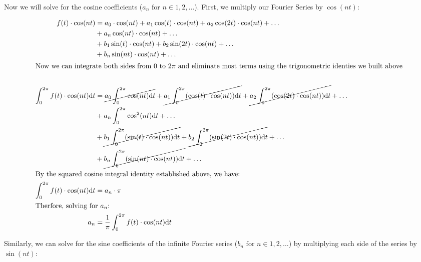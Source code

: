 \documentclass[10pt]{article} %
\begin{document}
Now we will solve for the cosine coefficients ($a_n \text{ for } n \in 1, 2, \dots$). First, we multiply our Fourier Series by $\cos(nt)$:

\begin{align*}
    f(t) \cdot \cos(nt) & = a_0 \cdot \cos(nt) + a_1\cos(t) \cdot \cos(nt) + a_2\cos(2t) \cdot \cos(nt) + \dots\\
    & + a_n\cos(nt) \cdot \cos(nt) + \dots \\
    & + b_1\sin(t) \cdot \cos(nt) + b_2\sin(2t) \cdot \cos(nt) + \dots \\
    & + b_n\sin(nt) \cdot \cos(nt) + \dots \\
    \intertext{Now we can integrate both sides from $0$ to $2\pi$ and eliminate most terms using the trigonometric identies we built above}\\
    \int_0^{2\pi}f(t) \cdot \cos(nt)\mathrm{d}t &= \cancel{a_0 \int_0^{2\pi} \cos(nt) \mathrm{d}t} + \cancel{a_1\int_0^{2\pi}(\cos(t) \cdot \cos(nt)) \mathrm{d}t} + \cancel{a_2\int_0^{2\pi}(\cos(2t) \cdot \cos(nt)) \mathrm{d}t} + \dots \\
    & + a_n\int_0^{2\pi} \cos^2(nt) \mathrm{d}t + \dots \\
    & + \cancel{b_1\int_0^{2\pi}(\sin(t) \cdot \cos(nt)) \mathrm{d}t} + \cancel{b_2\int_0^{2\pi}(\sin(2t) \cdot \cos(nt)) \mathrm{d}t} + \dots \\ 
    & + \cancel{b_n\int_0^{2\pi}(\sin(nt) \cdot \cos(nt)) \mathrm{d}t} + \dots \\
    \intertext{By the squared cosine integral identity established above, we have:}
    \int_0^{2\pi}f(t) \cdot \cos(nt)\mathrm{d}t & = a_n \cdot \pi \\
    \intertext{Therfore, solving for $a_n$:}
    a_n & = \frac1\pi \int_0^{2\pi} f(t) \cdot \cos(nt) \mathrm{d}t
\end{align*}

Similarly, we can solve for the sine coefficients of the infinite Fourier series ($b_n \text{ for } n \in 1, 2, \dots$) by multiplying each side of the series by $\sin(nt)$:
\end{document}
